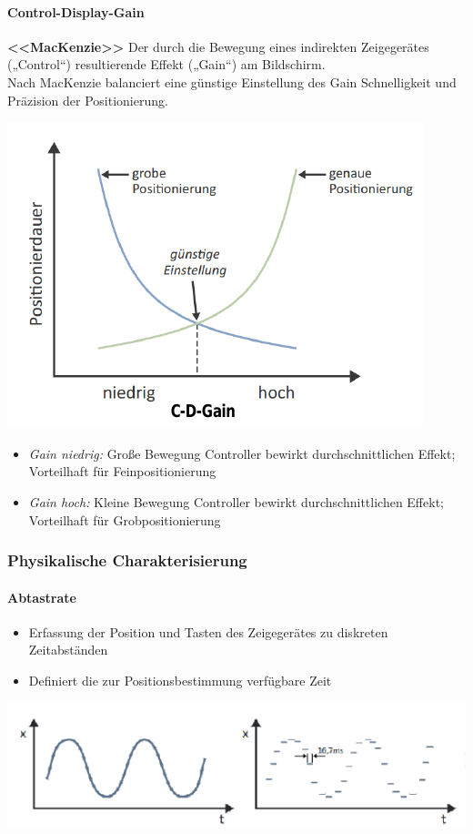\documentclass
[
	8pt,		%
	ngerman,	%
	a4paper,	%
	landscape,	%
	final		%
]{extarticle}
\begin{document}
\begin{multicols*}{4}
	\paragraph{Control-Display-Gain} \textbf{<<MacKenzie>>} Der durch die
	Bewegung eines indirekten Zeigegerätes („Control“) resultierende Effekt
	(„Gain“) am Bildschirm. \\
	Nach MacKenzie balanciert eine günstige Einstellung des Gain Schnelligkeit
	und Präzision der Positionierung.
	\begin{center}
		\includegraphics[width=0.7\linewidth]{./pictures/figure_01.png}
	\end{center}
	\begin{itemize}
		\item \textit{Gain niedrig:} Große Bewegung Controller bewirkt
		      durchschnittlichen Effekt; Vorteilhaft für Feinpositionierung
		\item \textit{Gain hoch:} Kleine Bewegung Controller bewirkt
		      durchschnittlichen Effekt; Vorteilhaft für Grobpositionierung
	\end{itemize}
	\subsubsection{Physikalische Charakterisierung}
	\paragraph{Abtastrate}
	\begin{itemize}
		\item Erfassung der Position und Tasten des Zeigegerätes zu diskreten
		      Zeitabständen
		\item Definiert die zur Positionsbestimmung verfügbare Zeit
	\end{itemize}
	\begin{center}
		\includegraphics[width=\linewidth]{./pictures/figure_02.png}
	\end{center}

\end{multicols*}
\end{document}
